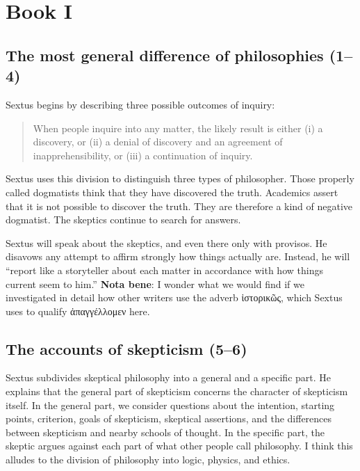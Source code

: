 \chapter{Book I}

\section{The most general difference of philosophies (1--4)}


Sextus begins by describing three possible outcomes of inquiry:

\begin{quote}
    When people inquire into any matter, the likely result is either (i) a discovery, or (ii) a denial of discovery and an agreement of inapprehensibility, or (iii) a continuation of inquiry.
\end{quote}

Sextus uses this division to distinguish three types of philosopher. Those properly called dogmatists think that they have discovered the truth. Academics assert that it is not possible to discover the truth. They are therefore a kind of negative dogmatist. The skeptics continue to search for answers.

Sextus will speak about the skeptics, and even there only with provisos. He disavows any attempt to affirm strongly how things actually are. Instead, he will ``report like a storyteller about each matter in accordance with how things current seem to him.'' \textbf{Nota bene}: I wonder what we would find if we investigated in detail how other writers use the adverb \textgreek{ἱστορικῶς}, which Sextus uses to qualify \textgreek{ἀπαγγέλλομεν} here.

\section{The accounts of skepticism (5--6)}


Sextus subdivides skeptical philosophy into a general and a specific part. He explains that the general part of skepticism concerns the character of skepticism itself. In the general part, we consider questions about the intention, starting points, criterion, goals of skepticism, skeptical assertions, and the differences between skepticism and nearby schools of thought. In the specific part, the skeptic argues against each part of what other people call philosophy. I think this alludes to the division of philosophy into logic, physics, and ethics.

